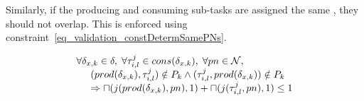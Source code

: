 \documentclass[main.tex]{subfiles}
\begin{document}
Similarly, if the producing and consuming sub-tasks are assigned the same \PN{}, they should not overlap. This is enforced using constraint~\ref{eq_validation_constDetermSamePNs}.

\begin{equation}
    \label{eq_validation_constDetermSamePNs}
    \begin{array}{l}
        \forall \delta_{x,k} \in \delta , \; \forall \tau_{i,l}^j \in cons( \delta_{x,k} ), \; \forall pn \in \mathcal{N}, \\
        \hspace{5mm} ( prod(\delta_{x,k}), \tau_{i,l}^j ) \notin P_k \land (\tau_{i,l}^j, prod(\delta_{x,k})) \notin P_k \\
        \hspace{5mm} \Rightarrow \sqcap ( j(prod(\delta_{x,k}), pn) ,1) + \sqcap ( j(\tau_{i,l}^j, pn) ,1) \leq 1
    \end{array}
\end{equation}








\end{document}
